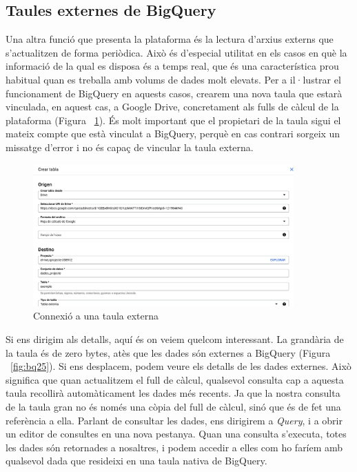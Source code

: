 \documentclass[12pt,longbibliography]{article}
\theoremstyle{definition}
\theoremstyle{remark}
\begin{document}
\subsection{Taules externes de BigQuery}

Una altra funció que presenta la plataforma és la lectura d'arxius externs que s'actualitzen de forma periòdica. Això és d'especial utilitat en els casos en què la informació de la qual es disposa és a temps real, que és una característica prou habitual quan es treballa amb volums de dades molt elevats. Per a il·lustrar el funcionament de BigQuery en aquests casos, crearem una nova taula que estarà vinculada, en aquest cas, a Google Drive, concretament als fulls de càlcul de la plataforma (Figura ~\ref{fig:bq24}). És molt important que el propietari de la taula sigui el mateix compte que està vinculat a BigQuery, perquè en cas contrari sorgeix un missatge d'error i no és capaç de vincular la taula externa.


\begin{figure}[h!]
\begin{center}
\includegraphics[width=10cm]{bq24}
\end{center}
\caption{Connexió a una taula externa}
\label{fig:bq24}
\end{figure}



Si ens dirigim als detalls, aquí és on veiem quelcom interessant. La grandària de la taula és de zero bytes, atès que les dades són externes a BigQuery (Figura ~\ref{fig:bq25}). Si ens desplacem, podem veure els detalls de les dades externes. Això significa que quan actualitzem el full de càlcul, qualsevol consulta cap a aquesta taula recollirà automàticament les dades més recents. Ja que la nostra consulta de la taula gran no és només una còpia del full de càlcul, sinó que és de fet una referència a ella. Parlant de consultar les dades, ens dirigirem a \textit{Query}, i a obrir un editor de consultes en una nova pestanya. Quan una consulta s'executa, totes les dades són retornades a nosaltres, i podem accedir a elles com ho faríem amb qualsevol dada que resideixi en una taula nativa de BigQuery. 
\end{document}
